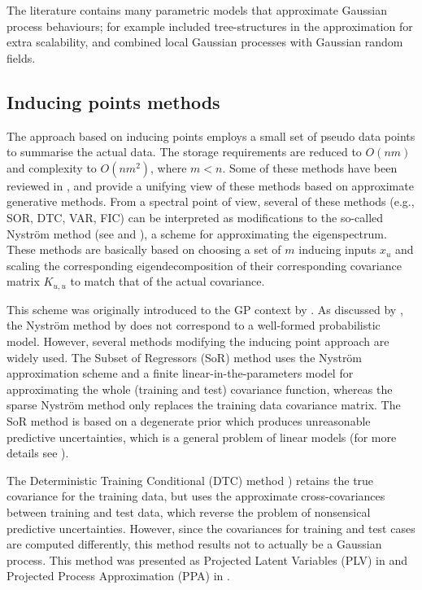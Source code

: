\documentclass[]{interact}
\theoremstyle{plain}%
\theoremstyle{definition}
\theoremstyle{remark}
\begin{document}
The literature contains many parametric models that approximate Gaussian process behaviours; for example \cite{bui2014tree} included  tree-structures in the approximation for extra scalability, and \cite{moore2015gaussian} combined local Gaussian
processes with Gaussian random fields.

\subsection{Inducing points methods}

The approach based on inducing points employs a small set of pseudo data points to summarise the actual data. The storage requirements are reduced to $O(nm)$ and complexity to $O(nm^2)$, where $m < n$. Some of these methods have been reviewed in \cite{rasmussen2006gaussian}, and \cite{quinonero2005unifying} provide a unifying view of these methods based on approximate generative methods. From a spectral point of view, several of these methods (e.g., SOR, DTC, VAR, FIC) can be interpreted as modiﬁcations to the so-called Nystr\"om method (see \cite{arthur1979baker} and \cite{williams2001using}), a scheme for approximating the eigenspectrum. These methods are basically based on choosing a set of $m$ inducing inputs $x_u$ and scaling the corresponding eigendecomposition of their corresponding covariance matrix $K_{u,u}$ to match that of the actual covariance. 

This scheme was originally introduced to the GP context by \cite{williams2001using}. As discussed by \cite{quinonero2005unifying}, the Nystr\"om method by \cite{williams2001using} does not correspond to a well-formed probabilistic model. However, several methods modifying the inducing point approach are widely used. The Subset of Regressors (SoR) \citep{smola2001sparse} method uses the Nystr\"om approximation scheme and a finite linear-in-the-parameters model for approximating the whole (training and test) covariance function, whereas the sparse Nystr\"om method \citep{williams2001using} only replaces the training data covariance matrix. The SoR method is based on a degenerate prior which produces unreasonable predictive uncertainties, which is a general problem of linear models (for more details see \cite{rasmussen2006gaussian}). 

The Deterministic Training Conditional (DTC) method \citep{ro2001sparse,seeger2003fast}) retains the true covariance for the training data, but uses the approximate cross-covariances between training and test data, which reverse the problem of nonsensical predictive uncertainties. However, since the covariances for training and test cases are computed differently, this method results not to actually be a Gaussian process. This method was presented as Projected Latent Variables (PLV) in \cite{seeger2003fast} and Projected Process Approximation (PPA) in \cite{rasmussen2006gaussian}. 
\end{document}
